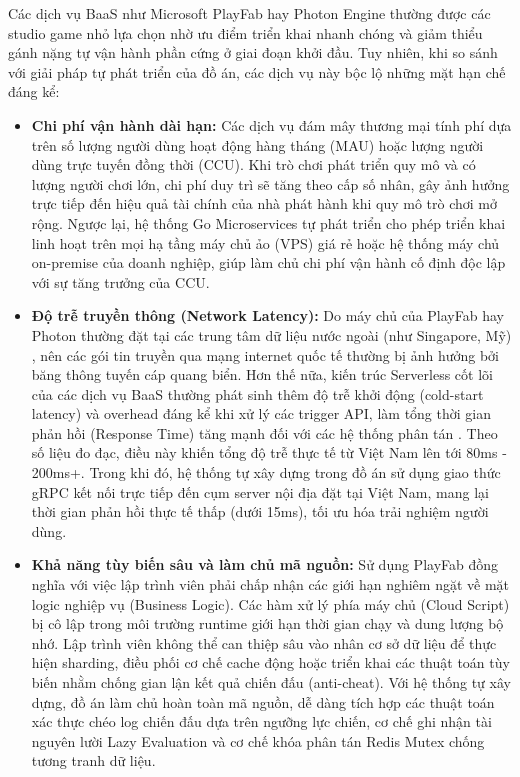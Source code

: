 \documentclass[../Project.tex]{subfiles}
\begin{document}
Các dịch vụ BaaS như Microsoft PlayFab hay Photon Engine thường được các studio game nhỏ lựa chọn \cite{playfab2026} nhờ ưu điểm triển khai nhanh chóng và giảm thiểu gánh nặng tự vận hành phần cứng ở giai đoạn khởi đầu. Tuy nhiên, khi so sánh với giải pháp tự phát triển của đồ án, các dịch vụ này bộc lộ những mặt hạn chế đáng kể:
\begin{itemize}
    \item \textbf{Chi phí vận hành dài hạn:} Các dịch vụ đám mây thương mại tính phí dựa trên số lượng người dùng hoạt động hàng tháng (MAU) hoặc lượng người dùng trực tuyến đồng thời (CCU). Khi trò chơi phát triển quy mô và có lượng người chơi lớn, chi phí duy trì sẽ tăng theo cấp số nhân, gây ảnh hưởng trực tiếp đến hiệu quả tài chính của nhà phát hành khi quy mô trò chơi mở rộng. Ngược lại, hệ thống Go Microservices tự phát triển cho phép triển khai linh hoạt trên mọi hạ tầng máy chủ ảo (VPS) giá rẻ hoặc hệ thống máy chủ on-premise của doanh nghiệp, giúp làm chủ chi phí vận hành cố định độc lập với sự tăng trưởng của CCU.
    \item \textbf{Độ trễ truyền thông (Network Latency):} Do máy chủ của PlayFab hay Photon thường đặt tại các trung tâm dữ liệu nước ngoài (như Singapore, Mỹ) \cite{playfab2026}, nên các gói tin truyền qua mạng internet quốc tế thường bị ảnh hưởng bởi băng thông tuyến cáp quang biển. Hơn thế nữa, kiến trúc Serverless cốt lõi của các dịch vụ BaaS thường phát sinh thêm độ trễ khởi động (cold-start latency) và overhead đáng kể khi xử lý các trigger API, làm tổng thời gian phản hồi (Response Time) tăng mạnh đối với các hệ thống phân tán \cite{scheuner2020faas}. Theo số liệu đo đạc, điều này khiến tổng độ trễ thực tế từ Việt Nam lên tới 80ms - 200ms+. Trong khi đó, hệ thống tự xây dựng trong đồ án sử dụng giao thức gRPC \cite{indrasiri2020grpc} kết nối trực tiếp đến cụm server nội địa đặt tại Việt Nam, mang lại thời gian phản hồi thực tế thấp (dưới 15ms), tối ưu hóa trải nghiệm người dùng.
    \item \textbf{Khả năng tùy biến sâu và làm chủ mã nguồn:} Sử dụng PlayFab đồng nghĩa với việc lập trình viên phải chấp nhận các giới hạn nghiêm ngặt về mặt logic nghiệp vụ (Business Logic). Các hàm xử lý phía máy chủ (Cloud Script) bị cô lập trong môi trường runtime giới hạn thời gian chạy và dung lượng bộ nhớ. Lập trình viên không thể can thiệp sâu vào nhân cơ sở dữ liệu để thực hiện sharding, điều phối cơ chế cache động hoặc triển khai các thuật toán tùy biến nhằm chống gian lận kết quả chiến đấu (anti-cheat). Với hệ thống tự xây dựng, đồ án làm chủ hoàn toàn mã nguồn, dễ dàng tích hợp các thuật toán xác thực chéo log chiến đấu dựa trên ngưỡng lực chiến, cơ chế ghi nhận tài nguyên lười Lazy Evaluation và cơ chế khóa phân tán Redis Mutex chống tương tranh dữ liệu.
\end{itemize}
\end{document}
